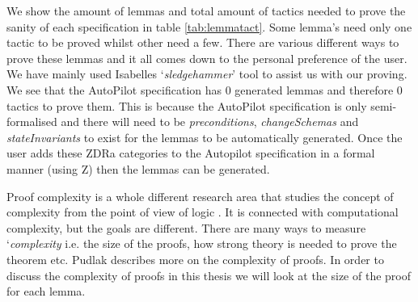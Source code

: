 We show the amount of lemmas and total amount of tactics needed to prove the
sanity of each specification in table \ref{tab:lemmatact}. Some lemma's need
only one tactic to be proved whilst other need a few. There are various
different ways to prove these lemmas and it all comes down to the personal
preference of the user. We have mainly used Isabelles `\emph{sledgehammer}' tool
to assist us with our proving.
We see that the AutoPilot specification has 0 generated lemmas and therefore 0
tactics to prove them. This is because the AutoPilot specification is only
semi-formalised and there will need to be \textit{preconditions}, \textit{changeSchemas} and
\textit{stateInvariants} to exist for the lemmas to be automatically generated.
Once the user adds these ZDRa categories to the Autopilot specification in a
formal manner (using Z) then the lemmas can be generated.

Proof complexity is a whole different research area that studies the concept of
complexity from the point of view of logic \cite{complexityofproofs}. It is connected with
computational complexity, but the goals are different. There are many ways to
measure `\textit{complexity} i.e. the size of the proofs, how strong theory is
needed to prove the theorem etc. Pudlak \cite{complexityofproofs} describes more on the
complexity of proofs. In order to discuss the complexity of proofs in this
thesis we will look at the size of the proof for each lemma.






